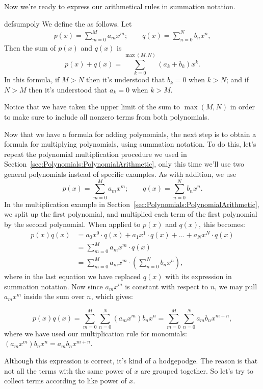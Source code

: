 Now we're ready to express our arithmetical rules in summation notation. 

\begin{defn}{defsumpoly}
We define the  as follows.  Let
\begin{align*}
p(x)  = \sum^{M}_{m=0} a_m x^m ; \qquad
q(x)  = \sum^{N}_{n=0} b_n x^n,
\end{align*}
Then the sum of $p(x)$ and $q(x)$ is
\[
p(x) + q(x) =  \sum_{k=0}^{\max(M,N)} (a_k + b_k) x^k.
\]
In this formula, if $M>N$ then it's understood that $b_k=0$ when $k>N$; and if $N>M$ then it's understood that $a_k = 0$ when $k>M$.
 \end{defn}

Notice that we have taken the upper limit of the sum to $\max(M,N)$ in order to make sure to include all nonzero terms from both polynomials. 

Now that we have a formula for adding polynomials, the next step is to obtain a formula for multiplying polynomials, using summation notation.
To do this, let's repeat the polynomial multiplication procedure we used in Section~\ref{sec:Polynomials:PolynomialArithmetic}, only this time we'll use two general polynomials instead of specific examples. As with addition, we use
$$
p(x)  = \sum^{M}_{m=0} a_m x^m; \qquad
q(x)  = \sum^{N}_{n=0} b_n x^n.
$$
In the multiplication example in Section~\ref{sec:Polynomials:PolynomialArithmetic}, we split up the first polynomial, and multiplied each term of the first polynomial by the second polynomial. When applied to $p(x)$ and $q(x)$, this becomes:
\begin{align*}
p(x)q(x)&= a_0x^0 \cdot q(x) + a_1x^1 \cdot q(x) + \ldots + a_Nx^N \cdot q(x) \\
&= \sum^M_{m=0} a_mx^m \cdot q(x)\\
&= \sum^M_{m=0} a_mx^m \cdot \left(\sum^{N}_{n=0} b_n x^n\right),
\end{align*}
where in the last equation we have replaced $q(x)$ with its expression in summation notation. Now since $a_mx^m$ is constant with respect to $n$, we may pull $a_mx^m$ inside the sum over $n$, which gives:

\[
p(x) q(x) =\sum_{m=0}^{M}\sum_{n=0}^{N}(a_mx^m) b_n x^{n}=\sum_{m=0}^{M}\sum_{n=0}^{N}a_m b_n x^{m+n},
\]
where we have used our multiplication rule for monomials:  $(a_mx^m) b_n x^{n}=a_m b_n x^{m+n}$.

Although this expression is correct, it's kind of a hodgepodge. The reason is that not all the terms with the same power of $x$ are grouped together. So let's try to collect terms according to like power of $x$. 

